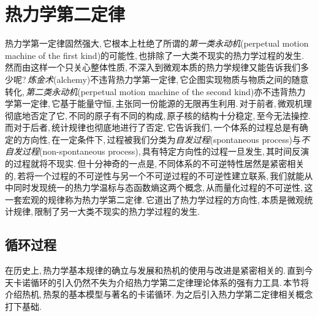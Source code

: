 \chapter{热力学第二定律}


热力学第一定律固然强大,\,它根本上杜绝了所谓的\emph{第一类永动机}(perpetual motion machine of the first kind)的可能性,\,也排除了一大类不现实的热力学过程的发生.\,然而由这样一个只关心整体性质,\,不深入到微观本质的热力学规律又能告诉我们多少呢?\,\emph{炼金术}(alchemy)不违背热力学第一定律,\,它企图实现物质与物质之间的随意转化,\,\emph{第二类永动机}(perpetual motion machine of the second kind)亦不违背热力学第一定律,\,它基于能量守恒,\,主张同一份能源的无限再生利用.\,对于前者,\,微观机理彻底地否定了它,\,不同的原子有不同的构成,\,原子核的结构十分稳定,\,至今无法操控.\,而对于后者,\,统计规律也彻底地进行了否定,\,它告诉我们,\,一个体系的过程总是有确定的方向性,\,在一定条件下,\,过程被我们分类为\emph{自发过程}(spontaneous process)与\emph{不自发过程}(non-spontaneous process),\,具有特定方向性的过程一旦发生,\,其时间反演的过程就将不现实.\,但十分神奇的一点是,\,不同体系的不可逆特性居然是紧密相关的,\,若将一个过程的不可逆性与另一个不可逆过程的不可逆性建立联系,\,我们就能从中同时发现统一的热力学温标与态函数熵这两个概念,\,从而量化过程的不可逆性,\,这一套宏观的规律称为热力学第二定律.\,它道出了热力学过程的方向性,\,本质是微观统计规律,\,限制了另一大类不现实的热力学过程的发生.


\section{循环过程}
在历史上,\,热力学基本规律的确立与发展和热机的使用与改进是紧密相关的.\,直到今天卡诺循环的引入仍然不失为介绍热力学第二定律理论体系的强有力工具.\,本节将介绍热机,\,热泵的基本模型与著名的卡诺循环.\,为之后引入热力学第二定律相关概念打下基础.


